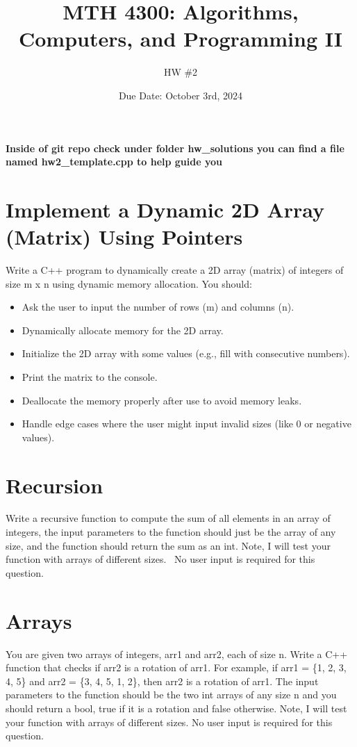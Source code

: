 \documentclass[a4paper]{article}
\title{MTH 4300: Algorithms, Computers, and Programming II}
\author{HW \#2}
\date{Due Date: October 3rd, 2024}
\begin{document}
\maketitle

\textbf{Inside of git repo check under folder hw\_solutions you can find a file named hw2\_template.cpp to help guide you}

\section{Implement a Dynamic 2D Array (Matrix) Using Pointers}
Write a C++ program to dynamically create a 2D array (matrix) of integers of size m x n using dynamic memory allocation. You should:
\begin{itemize}
    \item Ask the user to input the number of rows (m) and columns (n).
    \item Dynamically allocate memory for the 2D array.
    \item Initialize the 2D array with some values (e.g., fill with consecutive numbers).
    \item Print the matrix to the console.
    \item Deallocate the memory properly after use to avoid memory leaks.
    \item Handle edge cases where the user might input invalid sizes (like 0 or negative values).
\end{itemize}


\section{Recursion}
Write a recursive function to compute the sum of all elements in an array of integers, 
the input parameters to the function should just be the array of any size, and the function should return 
the sum as an int. Note, I will test your function with arrays of different sizes. \
No user input is required for this question.


\section{Arrays}
You are given two arrays of integers, arr1 and arr2, each of size n.
Write a C++ function that checks if arr2 is a rotation of arr1. For 
example, if arr1 = \{1, 2, 3, 4, 5\} and arr2 = \{3, 4, 5, 1, 2\}, then arr2
is a rotation of arr1. The input parameters to the function should be 
the two int arrays of any size n and you should return a bool, true if it
is a rotation and false otherwise. Note, I will test your function with arrays of different sizes.
No user input is required for this question.
\end{document}

